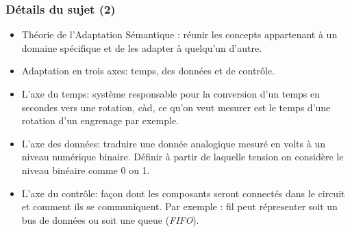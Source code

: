 \documentclass[10pt]{beamer}
\begin{document}
\begin{frame}
\frametitle{Détails du sujet (2)}

\begin{itemize}

  \item Théorie de \og l'Adaptation Sémantique \fg: réunir les concepts
  appartenant à un domaine spécifique et de les adapter à quelqu'un d'autre.
  \vspace{8pt}
  \item Adaptation en trois axes: temps, des données et de contrôle.
  \vspace{8pt}
  \item L'axe du temps: système responsable pour la conversion   d'un temps en
  secondes vers une rotation, càd, ce qu'on veut mesurer est le temps d'une
  rotation d'un engrenage par exemple.
  \vspace{8pt}
  \item L'axe des données: traduire une donnée analogique mesuré en volts à un
  niveau numérique binaire. Définir à partir de laquelle tension on
  considère le niveau binéaire comme 0 ou 1.
  \vspace{8pt} 
  \item L'axe du contrôle: façon dont les composants seront connectés dans le
  circuit et comment ils se communiquent. Par exemple : fil peut répresenter
  soit un bus de données ou soit une queue (\textit{FIFO}).


\end{itemize}
\end{frame}
\end{document}

